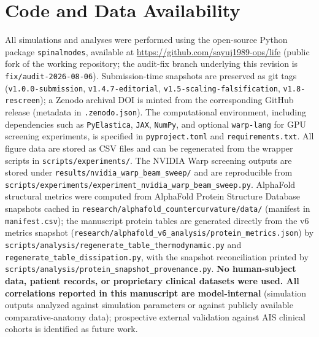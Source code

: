 \section*{Code and Data Availability}

All simulations and analyses were performed using the open-source Python package \texttt{spinalmodes}, available at \url{https://github.com/sayuj1989-ops/life} (public fork of the working repository; the audit-fix branch underlying this revision is \texttt{fix/audit-2026-08-06}). Submission-time snapshots are preserved as git tags (\texttt{v1.0.0-submission}, \texttt{v1.4.7-editorial}, \texttt{v1.5-scaling-falsification}, \texttt{v1.8-rescreen}); a Zenodo archival DOI is minted from the corresponding GitHub release (metadata in \texttt{.zenodo.json}). The computational environment, including dependencies such as \texttt{PyElastica}, \texttt{JAX}, \texttt{NumPy}, and optional \texttt{warp-lang} for GPU screening experiments, is specified in \texttt{pyproject.toml} and \texttt{requirements.txt}. All figure data are stored as CSV files and can be regenerated from the wrapper scripts in \texttt{scripts/experiments/}. The NVIDIA Warp screening outputs are stored under \texttt{results/nvidia\_warp\_beam\_sweep/} and are reproducible from \texttt{scripts/experiments/experiment\_nvidia\_warp\_beam\_sweep.py}. AlphaFold structural metrics were computed from AlphaFold Protein Structure Database snapshots cached in \texttt{research/alphafold\_countercurvature/data/} (manifest in \texttt{manifest.csv}); the manuscript protein tables are generated directly from the v6 metrics snapshot (\texttt{research/alphafold\_v6\_analysis/protein\_metrics.json}) by \texttt{scripts/analysis/regenerate\_table\_thermodynamic.py} and \texttt{regenerate\_table\_dissipation.py}, with the snapshot reconciliation printed by \texttt{scripts/analysis/protein\_snapshot\_provenance.py}. \textbf{No human-subject data, patient records, or proprietary clinical datasets were used. All correlations reported in this manuscript are model-internal} (simulation outputs analyzed against simulation parameters or against publicly available comparative-anatomy data); prospective external validation against AIS clinical cohorts is identified as future work.
